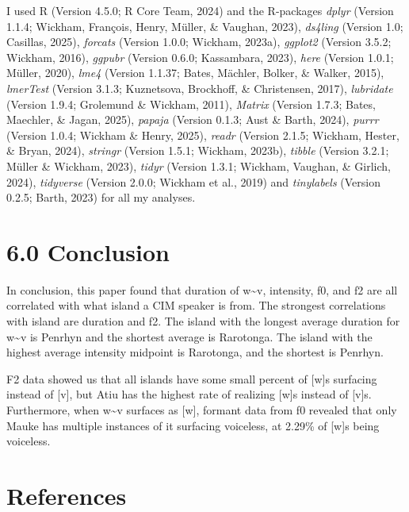\documentclass[
  ,man,floatsintext]{apa6}
\begin{document}
I used R (Version 4.5.0; R Core Team, 2024) and the R-packages \emph{dplyr} (Version 1.1.4; Wickham, François, Henry, Müller, \& Vaughan, 2023), \emph{ds4ling} (Version 1.0; Casillas, 2025), \emph{forcats} (Version 1.0.0; Wickham, 2023a), \emph{ggplot2} (Version 3.5.2; Wickham, 2016), \emph{ggpubr} (Version 0.6.0; Kassambara, 2023), \emph{here} (Version 1.0.1; Müller, 2020), \emph{lme4} (Version 1.1.37; Bates, Mächler, Bolker, \& Walker, 2015), \emph{lmerTest} (Version 3.1.3; Kuznetsova, Brockhoff, \& Christensen, 2017), \emph{lubridate} (Version 1.9.4; Grolemund \& Wickham, 2011), \emph{Matrix} (Version 1.7.3; Bates, Maechler, \& Jagan, 2025), \emph{papaja} (Version 0.1.3; Aust \& Barth, 2024), \emph{purrr} (Version 1.0.4; Wickham \& Henry, 2025), \emph{readr} (Version 2.1.5; Wickham, Hester, \& Bryan, 2024), \emph{stringr} (Version 1.5.1; Wickham, 2023b), \emph{tibble} (Version 3.2.1; Müller \& Wickham, 2023), \emph{tidyr} (Version 1.3.1; Wickham, Vaughan, \& Girlich, 2024), \emph{tidyverse} (Version 2.0.0; Wickham et al., 2019) and \emph{tinylabels} (Version 0.2.5; Barth, 2023) for all my analyses.

\section{6.0 Conclusion}\label{conclusion}

In conclusion, this paper found that duration of w\textasciitilde v, intensity, f0, and f2 are all correlated with what island a CIM speaker is from. The strongest correlations with island are duration and f2. The island with the longest average duration for w\textasciitilde v is Penrhyn and the shortest average is Rarotonga. The island with the highest average intensity midpoint is Rarotonga, and the shortest is Penrhyn.

F2 data showed us that all islands have some small percent of {[}w{]}s surfacing instead of {[}v{]}, but Atiu has the highest rate of realizing {[}w{]}s instead of {[}v{]}s. Furthermore, when w\textasciitilde v surfaces as {[}w{]}, formant data from f0 revealed that only Mauke has multiple instances of it surfacing voiceless, at 2.29\% of {[}w{]}s being voiceless.

\section{References}\label{references}

\setlength{\parindent}{-0.5in}
\setlength{\leftskip}{0.5in}
\end{document}
